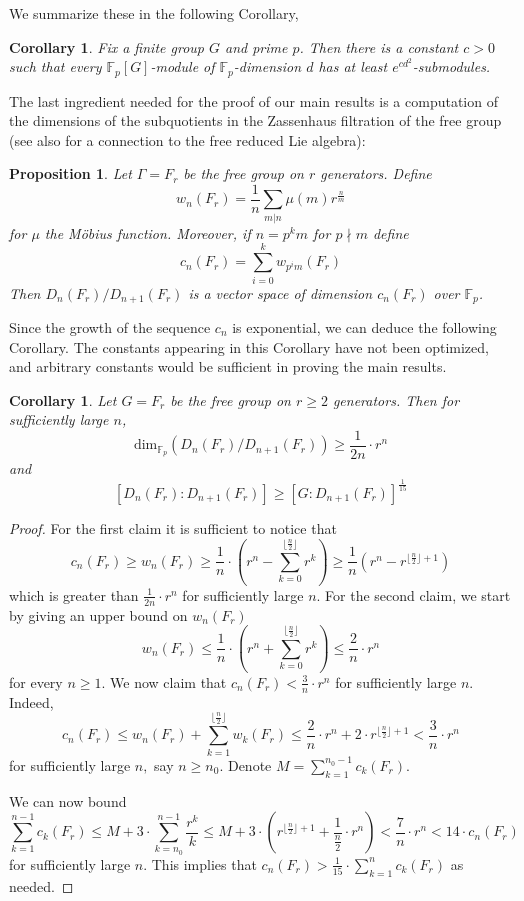 \documentclass[letterpaper]{amsart}
\newtheorem{corollary}[theorem]{Corollary}
\newtheorem{proposition}[theorem]{Proposition}
\begin{document}
We summarize these in the following Corollary,
\begin{corollary}
\label{Lots of Submodules}
Fix a finite group $G$ and prime $p$. Then there is a constant $c > 0$ such that every $\mathbb{F}_p[G]$-module of $\mathbb{F}_p$-dimension $d$ has at least $e^{cd^2}$-submodules.
\end{corollary}
The last ingredient needed for the proof of our main results is a computation of the dimensions of the subquotients in the Zassenhaus filtration of the free group \cite[Proposition 3.4]{minavc2016dimensions} (see also \cite{lazard1954groupes} for a connection to the free reduced Lie algebra):
\begin{proposition}
\label{Zassenhaus dimension computation}
Let $\Gamma = F_r$ be the free group on $r$ generators.
Define
$$w_n(F_r) = \frac{1}{n} \sum_{m | n} \mu(m) r^{\frac{n}{m}}$$
for $\mu$ the Möbius function. Moreover, if $n = p^k m$ for $p \nmid m$ define
$$c_n(F_r) = \sum_{i=0}^kw_{p^im}(F_r)$$
Then $D_n(F_r)/D_{n+1}(F_r)$ is a vector space of dimension $c_n(F_r)$ over $\mathbb{F}_p$.
\end{proposition}
Since the growth of the sequence $c_n$ is exponential, we can deduce the following Corollary. The constants appearing in this Corollary have not been optimized, and arbitrary constants would be sufficient in proving the main results.
\begin{corollary}
\label{exponential growth}
Let $G = F_r$ be the free group on $r \geq 2$ generators. Then for sufficiently large $n$,
$$\mathrm{dim}_{\mathbb{F}_p}(D_n(F_r) / D_{n+1}(F_r)) \geq \frac{1}{2n} \cdot r^n$$ and
$$[D_n(F_r): D_{n+1}(F_r)] \geq [G: D_{n + 1}(F_r)]^{\frac{1}{15}}$$
\end{corollary}
\begin{proof}
For the first claim it is sufficient to notice that $$c_n(F_r) \geq w_n(F_r) \geq \frac{1}{n} \cdot (r^n - \sum_{k=0}^{\lfloor\frac{n}{2}\rfloor} r^k) \geq \frac{1}{n}(r^n - r^{\lfloor\frac{n}{2}\rfloor + 1})$$
which is greater than $\frac{1}{2n} \cdot r^n$ for sufficiently large $n$.
For the second claim, we start by giving an upper bound on $w_n(F_r)$
$$w_n(F_r) \leq \frac{1}{n} \cdot (r^n + \sum_{k=0}^{\lfloor\frac{n}{2}\rfloor} r^k) \leq \frac{2}{n} \cdot r^n$$
for every $n \geq 1$. We now claim that $c_n(F_r) < \frac{3}{n} \cdot r^n$ for sufficiently large $n.$ Indeed, $$c_n(F_r) \leq w_n(F_r) + \sum_{k=1}^{\lfloor\frac{n}{2}\rfloor} w_k(F_r)\leq \frac{2}{n} \cdot r^n + 2\cdot r^{\lfloor\frac{n}{2}\rfloor + 1} < \frac{3}{n} \cdot r^n$$
for sufficiently large $n,$ say $n \geq n_0$. Denote $M = \sum_{k=1}^{n_0 - 1}c_k(F_r)$.

We can now bound $$\sum_{k = 1}^{n - 1} c_k(F_r) \leq M + 3 \cdot \sum_{k=n_0}^{n - 1} \frac{r^k}{k} \leq M + 3 \cdot (r^{\lfloor \frac{n}{2} \rfloor + 1} + \frac{1}{\frac{n}{2}} \cdot r^n) < \frac{7}{n}  \cdot r^n < 14 \cdot c_n(F_r)$$ for sufficiently large $n.$ This implies that $c_n(F_r) > \frac{1}{15} \cdot \sum_{k=1}^n c_k(F_r)$ as needed.
\end{proof}
\end{document}
